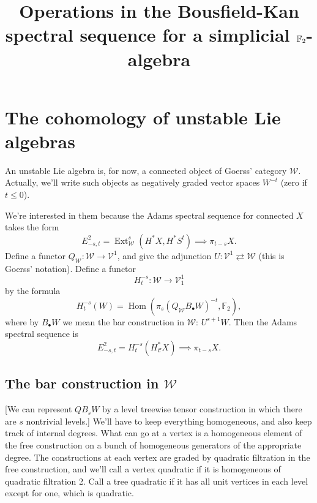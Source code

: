 \documentclass[11pt]{amsart}
\title[Operations in the Bousfield-Kan spectral sequence for a simplicial $\F_2$-algebra]{Operations in the Bousfield-Kan spectral sequence for a simplicial $\F_2$-algebra}
\theoremstyle{plain}
\theoremstyle{definition}
\DeclareMathOperator{\Hom}{Hom}
\DeclareMathOperator{\Ext}{Ext}
\renewcommand{\to}{\longrightarrow}
\newcommand{\calW}{\mathcal{W}}
\newcommand{\calC}{\mathcal{C}}
\newcommand{\calV}{\mathcal{V}}
\theoremstyle{plain}
\newcommand{\F}{\mathbb{F}}
\begin{document}

\section{The cohomology of unstable Lie algebras}
An unstable Lie algebra is, for now, a connected object of Goerss' category $\calW$. Actually, we'll write such objects as negatively graded vector spaces $W^{-t}$ (zero if $t\leq0$).

 We're interested in them because the Adams spectral sequence for connected $X$ takes the form
\[E^2_{-s,t}=\Ext_\calW^s(H^*X,H^*S^t)\implies \pi_{t-s}X.\]
Define a functor $Q_\calW:\calW\to \calV^1$, and give the adjunction $U:\calV^1\rightleftarrows \calW$ (this is Goerss' notation).
Define a functor
\[H^{-s}_t:\calW \to \calV^1_1\]
by the formula
\[H^{-s}_t(W)=\Hom(\pi_s(Q_\calW B_{\bullet}W)^{-t},\F_2),\]
where by $B_\bullet W$ we mean the bar construction in $\calW$: $U^{s+1}W$.
Then the Adams spectral sequence is
\[E^2_{-s,t}=H_{t}^{-s}(H^*_\calC X)\implies\pi_{t-s}X.\]



\subsection{The bar construction in $\calW$}
[We can represent $QB_sW$ by a level treewise tensor construction in which there are $s$ nontrivial levels.] We'll have to keep everything homogeneous, and also keep track of internal degrees. What can go at a vertex is a homogeneous element of the free construction on a bunch of homogeneous generators of the appropriate degree. The constructions at each vertex are graded by quadratic filtration in the free construction, and we'll call a vertex quadratic if it is homogeneous of quadratic filtration 2. Call a tree quadratic if it has all unit vertices in each level except for one, which is quadratic.
\end{document}
